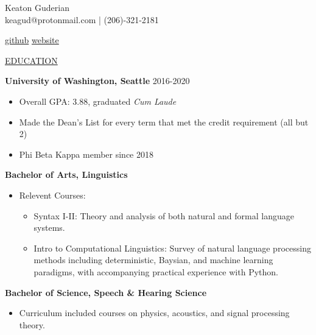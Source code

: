 \documentclass[11pt]{article}
\newcommand{\resumetitle}[3]{
    \AddToShipoutPictureBG{
        \AtPageUpperLeft {
        \raisebox{-0.09\paperheight}{
            \color{black!85}\rule{2\paperwidth}{\paperheight}}
        }}
    \begin{Center}
        \begingroup
        \titlethin
        \color{black!10}\Huge{#1}
        \titlethick
        \color{black!5}\Huge{#2} \\
        \vspace{2mm}
        \textrm{\color{black!15}\Large{#3}}
        \endgroup
    \end{Center}
    \vspace{7mm}
}
\newcommand{\betteruline}[1]{
    \uline{#1}
}
\newcommand{\sectiontitle}[1]{
    \begingroup
        \titlebold
        \betteruline{\Large\uppercase{#1}  }
        \vspace{1.7mm}
    \endgroup
}
\newcommand{\sectioncontent}[1]{
    \begingroup
        \begin{FlushLeft}
        \vspace{-3mm}
        \sffamily\small#1
        \end{FlushLeft}
    \endgroup
    \vspace{2mm}
}
\newcommand{\spacevv}{
    \vspace{2mm}
}
\begin{document}
    \resumetitle{Keaton}{Guderian} {
      keagud@protonmail.com | (206)-321-2181
    }



        \href{https://github.com/keagud}{github} \hspace{5mm} 
        \href{keagud.github.io}{website} \\

        \spacevv

    \sectiontitle{education}
    \sectioncontent{
        \begingroup
      \textbf{University of Washington, Seattle }\hfill\color{black!70}\small{2016-2020}
        \endgroup
      \begin{itemize}
      \item Overall GPA: 3.88, graduated \textit{Cum Laude}
      \item Made the Dean's List for every term that met the credit requirement (all but 2)
      \item Phi Beta Kappa member since 2018
        \end{itemize}
      \item \textbf{Bachelor of Arts, Linguistics }
        \begin{itemize}
          \item Relevent Courses: 
            \begin{itemize}
              \item Syntax I-II: Theory and analysis of both natural and formal language systems.
              \item Intro to Computational Linguistics: Survey of natural language processing methods including deterministic, Baysian, and machine learning paradigms, with accompanying practical experience with Python.
            \end{itemize}

        \end{itemize}
      \item \textbf{Bachelor of Science, Speech \& Hearing Science}

            \begin{itemize}
              \item Curriculum included courses on physics, acoustics, and signal processing theory.
            \end{itemize}

      } 
    
\end{document}
